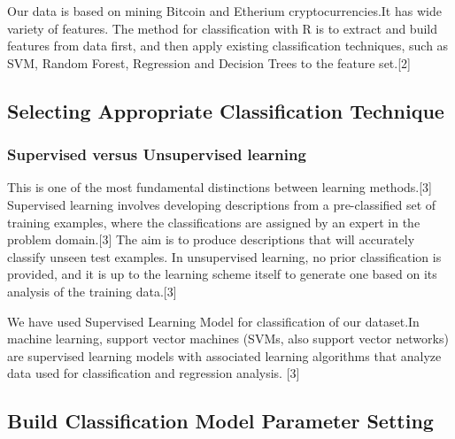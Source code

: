 \documentclass{article}
\begin{document}
Our data is based on mining Bitcoin and Etherium cryptocurrencies.It has wide variety of features.
The method for classification with R is to extract and build features from data first, and then apply existing classification techniques, such as SVM, Random Forest, Regression and Decision Trees to the feature set.[2]

\subsection{Selecting Appropriate Classification
Technique }

\subsubsection {Supervised versus Unsupervised learning} This is one of the most fundamental distinctions between learning methods.[3] Supervised learning involves developing descriptions from a pre-classified set of training examples, where the classifications are assigned by an expert in the problem domain.[3] The aim is to produce descriptions that will accurately classify unseen test examples. In unsupervised learning, no prior classification is provided, and it is up to the learning scheme itself to generate one based on its analysis of the training data.[3] \newline

We have used Supervised Learning Model for classification of our dataset.In machine learning, support vector machines (SVMs, also support vector networks) are supervised learning models with associated learning algorithms that analyze data used for classification and regression analysis. [3]


\subsection {Build Classification Model Parameter Setting}
\end{document}
